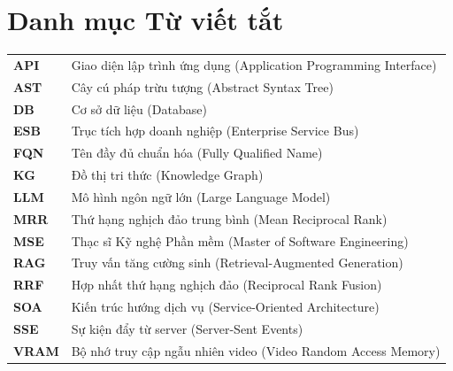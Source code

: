 \documentclass[12pt,a4paper,oneside]{report}
\begin{document}
\newpage

\tableofcontents
\newpage

\listoftables
{}
\newpage

\listoffigures
{}
\newpage

\chapter*{Danh mục Từ viết tắt}
\begin{singlespace}
\begin{tabular}{ll}
    \textbf{API} & Giao diện lập trình ứng dụng (Application Programming Interface) \\
    \textbf{AST} & Cây cú pháp trừu tượng (Abstract Syntax Tree) \\
    \textbf{DB} & Cơ sở dữ liệu (Database) \\
    \textbf{ESB} & Trục tích hợp doanh nghiệp (Enterprise Service Bus) \\
    \textbf{FQN} & Tên đầy đủ chuẩn hóa (Fully Qualified Name) \\
    \textbf{KG} & Đồ thị tri thức (Knowledge Graph) \\
    \textbf{LLM} & Mô hình ngôn ngữ lớn (Large Language Model) \\
    \textbf{MRR} & Thứ hạng nghịch đảo trung bình (Mean Reciprocal Rank) \\
    \textbf{MSE} & Thạc sĩ Kỹ nghệ Phần mềm (Master of Software Engineering) \\
    \textbf{RAG} & Truy vấn tăng cường sinh (Retrieval-Augmented Generation) \\
    \textbf{RRF} & Hợp nhất thứ hạng nghịch đảo (Reciprocal Rank Fusion) \\
    \textbf{SOA} & Kiến trúc hướng dịch vụ (Service-Oriented Architecture) \\
    \textbf{SSE} & Sự kiện đẩy từ server (Server-Sent Events) \\
    \textbf{VRAM} & Bộ nhớ truy cập ngẫu nhiên video (Video Random Access Memory) \\
\end{tabular}
\end{singlespace}
\newpage
\end{document}
